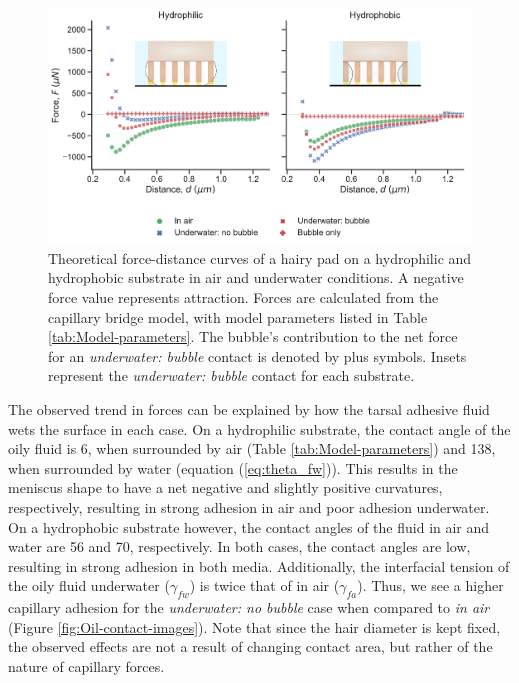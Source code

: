 \documentclass[vruler,JEB]{COB}%
\begin{document}
\begin{figure}
\centering
\includegraphics[width=6in]{Figure5-Model_effect_of_substrate}\caption{\label{fig:Effect-of-substrate}Theoretical force-distance curves
of a hairy pad on a hydrophilic and hydrophobic substrate in
air and underwater conditions. A negative force value represents attraction.
Forces are calculated from the capillary bridge model,
with model parameters listed in Table \ref{tab:Model-parameters}.
The bubble's contribution to the net force for an \emph{underwater:
bubble} contact is denoted by plus symbols. Insets represent the \emph{underwater:
bubble} contact for each substrate.}
\end{figure}

The observed trend in forces can be explained by how the tarsal adhesive
fluid wets the surface in each case. On a hydrophilic substrate, the
contact angle of the oily fluid is 6\textdegree , when surrounded
by air (Table \ref{tab:Model-parameters}) and 138\textdegree , when
surrounded by water (equation (\ref{eq:theta_fw})). This results
in the meniscus shape to have a net negative and slightly positive
curvatures, respectively, resulting in strong adhesion in air and
poor adhesion underwater. On a hydrophobic substrate however, the
contact angles of the fluid in air and water are 56\textdegree{} and
70\textdegree , respectively. In both cases, the contact angles are
low, resulting in strong adhesion in both media. Additionally, the
interfacial tension of the oily fluid underwater ($\gamma_{fw}$)
is twice that of in air ($\gamma_{fa}$). Thus, we see a higher capillary
adhesion for the \emph{underwater: no bubble} case when compared to
\emph{in air} (Figure \ref{fig:Oil-contact-images}). Note that since the hair diameter is kept fixed, the observed effects are not a result
of changing contact area, but rather of the nature of capillary forces.
\end{document}
